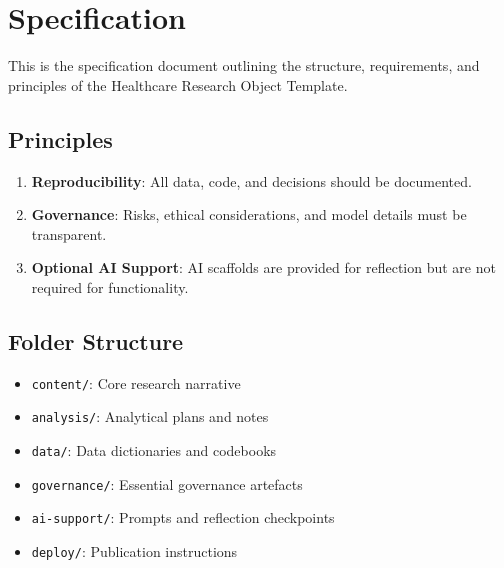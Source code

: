 \documentclass[
]{report}
\author{}
\date{}
\providecommand{\tightlist}{%
  \setlength{\itemsep}{0pt}\setlength{\parskip}{0pt}}
\renewcommand*\contentsname{Table of contents}
\newcommand\contentsname{Table of contents}
\begin{document}
\renewcommand*\contentsname{Table of contents}
{
\hypersetup{linkcolor=}
\setcounter{tocdepth}{2}
\tableofcontents
}

\chapter{Specification}\label{specification}

This is the specification document outlining the structure,
requirements, and principles of the Healthcare Research Object Template.

\section{Principles}\label{principles}

\begin{enumerate}
\def\labelenumi{\arabic{enumi}.}
\tightlist
\item
  \textbf{Reproducibility}: All data, code, and decisions should be
  documented.
\item
  \textbf{Governance}: Risks, ethical considerations, and model details
  must be transparent.
\item
  \textbf{Optional AI Support}: AI scaffolds are provided for reflection
  but are not required for functionality.
\end{enumerate}

\section{Folder Structure}\label{folder-structure}

\begin{itemize}
\tightlist
\item
  \texttt{content/}: Core research narrative
\item
  \texttt{analysis/}: Analytical plans and notes
\item
  \texttt{data/}: Data dictionaries and codebooks
\item
  \texttt{governance/}: Essential governance artefacts
\item
  \texttt{ai-support/}: Prompts and reflection checkpoints
\item
  \texttt{deploy/}: Publication instructions
\end{itemize}
\end{document}
